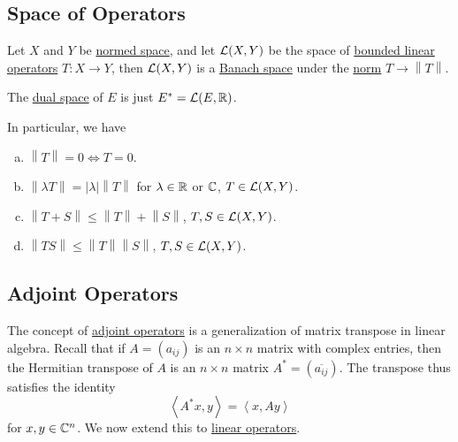 \subsection{Space of Operators}
Let \(X\) and \(Y\) be \hyperref[def:normed-vector-space]{normed space}, and let \(\mathcal{\MakeUppercase{l}} (X, Y) \) be the space of \hyperref[def:bounded-linear-op]{bounded linear operators} \(T\colon X\to Y\), then \(\mathcal{\MakeUppercase{l}} (X, Y)\) is a \hyperref[def:Banach-space]{Banach space} under the \hyperref[def:norm]{norm} \(T\to \left\lVert T\right\rVert \).

\begin{eg}
	The \hyperref[def:dual-space]{dual space} of \(E\) is just \(E^{\ast} = \mathcal{\MakeUppercase{l}} (E, \mathbb{\MakeUppercase{r}} )\).
\end{eg}

\begin{remark}
	In particular, we have
	\begin{enumerate}[(a)]
		\item \(\left\lVert T\right\rVert = 0 \iff T = 0\).
		\item \(\left\lVert \lambda T\right\rVert = \left\vert \lambda  \right\vert \left\lVert T\right\rVert  \) for \(\lambda \in \mathbb{\MakeUppercase{r}} \) or \(\mathbb{\MakeUppercase{c}} \), \(T\in \mathcal{\MakeUppercase{l}} (X, Y)\).
		\item \(\left\lVert T + S\right\rVert \leq \left\lVert T\right\rVert + \left\lVert S\right\rVert \), \(T, S \in \mathcal{\MakeUppercase{l}} (X, Y)\).
		\item \(\left\lVert TS\right\rVert \leq \left\lVert T\right\rVert \left\lVert S\right\rVert \), \(T, S\in \mathcal{\MakeUppercase{l}} (X, Y)\).
	\end{enumerate}
\end{remark}

\subsection{Adjoint Operators}
The concept of \hyperref[def:adjoint-op]{adjoint operators} is a generalization of matrix transpose in linear algebra. Recall that if \(A = (a_{ij} )\) is an \(n\times n\) matrix with complex entries, then the Hermitian transpose of \(A\) is an \(n\times n\) matrix \(A^{\ast} = (\overline{a_{ij}})\). The transpose thus satisfies the identity
\[
	\left\langle A^{\ast} x, y \right\rangle = \left\langle x, Ay \right\rangle
\]
for \(x, y\in \mathbb{\MakeUppercase{c}} ^n\). We now extend this to \hyperref[def:linear-op]{linear operators}.

